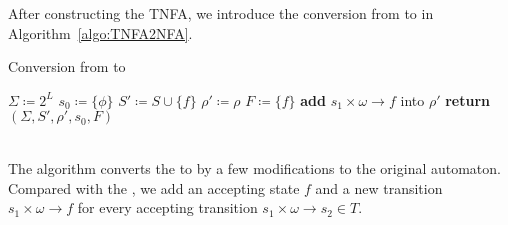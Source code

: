 After constructing the TNFA, we introduce the conversion from \TNFA to \NFA in Algorithm~\ref{algo:TNFA2NFA}.

\begin{algorithm}[H] \label{algo:TNFA2NFA}
  \caption{Conversion from \TNFA to \NFA}
  \LinesNumbered
  $\Sigma\coloneqq 2^L$\;
  $s_0\coloneqq\{\phi\}$\;
  $S'\coloneqq S\cup \{f\}$\;
  $\rho'\coloneqq\rho$\;
  $F\coloneqq \{f\}$\;
  {
    \textbf{add} $s_1\times \omega\to f$ into $\rho'$\;
  }
  \textbf{return} $(\Sigma,S',\rho',s_0,F)$\;
  \end{algorithm}
~\\
The algorithm converts the \TNFA to \NFA by a few modifications to the original automaton. Compared with the \TNFA, we add an accepting state $f$ and a new transition $s_1\times \omega\to f$ for every accepting transition $s_1\times \omega\to s_2\in T$.
